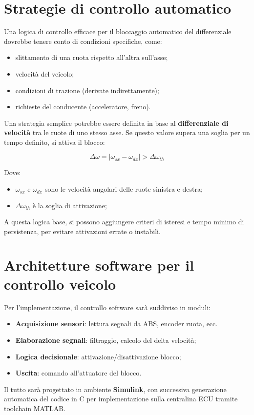 \documentclass[11pt]{report}
\begin{document}
	\section{Strategie di controllo automatico}
	
	Una logica di controllo efficace per il bloccaggio automatico del differenziale dovrebbe tenere conto di condizioni specifiche, come:
	
	\begin{itemize}
		\item slittamento di una ruota rispetto all’altra sull’asse;
		\item velocità del veicolo;
		\item condizioni di trazione (derivate indirettamente);
		\item richieste del conducente (acceleratore, freno).
	\end{itemize}
	
	Una strategia semplice potrebbe essere definita in base al \textbf{differenziale di velocità} tra le ruote di uno stesso asse. Se questo valore supera una soglia per un tempo definito, si attiva il blocco:
	
	\begin{equation}
		\Delta \omega = |\omega_{sx} - \omega_{dx}| > \Delta \omega_{th}
	\end{equation}
	
	Dove:
	\begin{itemize}
		\item $\omega_{sx}$ e $\omega_{dx}$ sono le velocità angolari delle ruote sinistra e destra;
		\item $\Delta \omega_{th}$ è la soglia di attivazione;
	\end{itemize}
	
	A questa logica base, si possono aggiungere criteri di isteresi e tempo minimo di persistenza, per evitare attivazioni errate o instabili.
	
	\section{Architetture software per il controllo veicolo}
	
	Per l’implementazione, il controllo software sarà suddiviso in moduli:
	
	\begin{itemize}
		\item \textbf{Acquisizione sensori}: lettura segnali da ABS, encoder ruota, ecc.
		\item \textbf{Elaborazione segnali}: filtraggio, calcolo del delta velocità;
		\item \textbf{Logica decisionale}: attivazione/disattivazione blocco;
		\item \textbf{Uscita}: comando all’attuatore del blocco.
	\end{itemize}
	
	Il tutto sarà progettato in ambiente \textbf{Simulink}, con successiva generazione automatica del codice in C per implementazione sulla centralina ECU tramite toolchain MATLAB.
	
	
\end{document}
